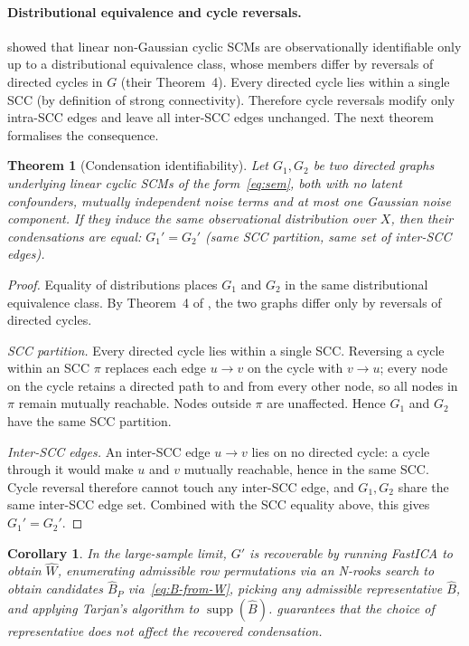 \documentclass{article}
\newtheorem{theorem}{Theorem}
\newtheorem{corollary}{Corollary}
\begin{document}
\paragraph{Distributional equivalence and cycle reversals.}
\citet{lacerda2008discovering} showed that linear non-Gaussian cyclic SCMs are observationally identifiable only up to a distributional equivalence class, whose members differ by reversals of directed cycles in $G$ (their Theorem~4). Every directed cycle lies within a single SCC (by definition of strong connectivity). Therefore cycle reversals modify only intra-SCC edges and leave all inter-SCC edges unchanged. The next theorem formalises the consequence.

\begin{theorem}[Condensation identifiability]\label{thm:condensation-id}
    Let $G_1, G_2$ be two directed graphs underlying linear cyclic SCMs of the form~\eqref{eq:sem}, both with no latent confounders, mutually independent noise terms and at most one Gaussian noise component. If they induce the same observational distribution over $X$, then their condensations are equal: $G_1' = G_2'$ (same SCC partition, same set of inter-SCC edges).
\end{theorem}

\begin{proof}
    Equality of distributions places $G_1$ and $G_2$ in the same distributional equivalence class. By Theorem~4 of \citet{lacerda2008discovering}, the two graphs differ only by reversals of directed cycles.

    \emph{SCC partition.} Every directed cycle lies within a single SCC. Reversing a cycle within an SCC $\pi$ replaces each edge $u \to v$ on the cycle with $v \to u$; every node on the cycle retains a directed path to and from every other node, so all nodes in $\pi$ remain mutually reachable. Nodes outside $\pi$ are unaffected. Hence $G_1$ and $G_2$ have the same SCC partition.

    \emph{Inter-SCC edges.} An inter-SCC edge $u \to v$ lies on no directed cycle: a cycle through it would make $u$ and $v$ mutually reachable, hence in the same SCC. Cycle reversal therefore cannot touch any inter-SCC edge, and $G_1, G_2$ share the same inter-SCC edge set. Combined with the SCC equality above, this gives $G_1' = G_2'$.
\end{proof}

\begin{corollary}\label{cor:condensation-id}
    In the large-sample limit, $G'$ is recoverable by running FastICA to obtain $\hat W$, enumerating admissible row permutations via an N-rooks search to obtain candidates $\hat B_P$ via~\eqref{eq:B-from-W}, picking any admissible representative $\hat B$, and applying Tarjan's algorithm to $\operatorname{supp}(\hat B)$.  guarantees that the choice of representative does not affect the recovered condensation.
\end{corollary}
\end{document}
